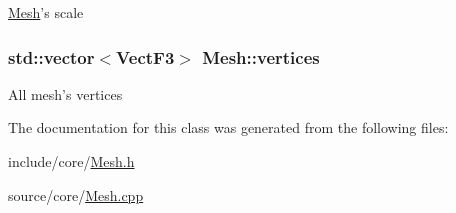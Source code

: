 \hyperlink{classMesh}{Mesh}'s scale \hypertarget{classMesh_aa244d2814833308fc7b96e21b71cccfd}{
\subsubsection[{vertices}]{\setlength{\rightskip}{0pt plus 5cm}std\-::vector$<${\bf Vect\-F3}$>$ Mesh\-::vertices}}\label{classMesh_aa244d2814833308fc7b96e21b71cccfd}
All mesh's vertices 

The documentation for this class was generated from the following files\-:\begin{DoxyCompactItemize}
\item 
include/core/\hyperlink{Mesh_8h}{Mesh.\-h}\item 
source/core/\hyperlink{Mesh_8cpp}{Mesh.\-cpp}\end{DoxyCompactItemize}
